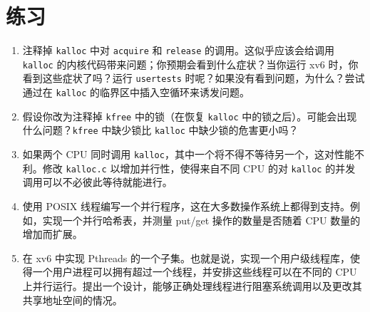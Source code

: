 \section{练习}

\begin{enumerate}

\item 注释掉 \lstinline{kalloc}  中对 \lstinline{acquire} 和 \lstinline{release} 的调用。这似乎应该会给调用 \lstinline{kalloc} 的内核代码带来问题；你预期会看到什么症状？当你运行 xv6 时，你看到这些症状了吗？运行 \lstinline{usertests} 时呢？如果没有看到问题，为什么？尝试通过在 \lstinline{kalloc} 的临界区中插入空循环来诱发问题。

\item 假设你改为注释掉 \lstinline{kfree} 中的锁（在恢复 \lstinline{kalloc} 中的锁之后）。可能会出现什么问题？\lstinline{kfree} 中缺少锁比 \lstinline{kalloc} 中缺少锁的危害更小吗？

\item 如果两个 CPU 同时调用 \lstinline{kalloc}，其中一个将不得不等待另一个，这对性能不利。修改 \lstinline{kalloc.c} 以增加并行性，使得来自不同 CPU 的对 \lstinline{kalloc} 的并发调用可以不必彼此等待就能进行。

\item 使用 POSIX 线程编写一个并行程序，这在大多数操作系统上都得到支持。例如，实现一个并行哈希表，并测量 put/get 操作的数量是否随着 CPU 数量的增加而扩展。

\item 在 xv6 中实现 Pthreads 的一个子集。也就是说，实现一个用户级线程库，使得一个用户进程可以拥有超过一个线程，并安排这些线程可以在不同的 CPU 上并行运行。提出一个设计，能够正确处理线程进行阻塞系统调用以及更改其共享地址空间的情况。

\end{enumerate}

